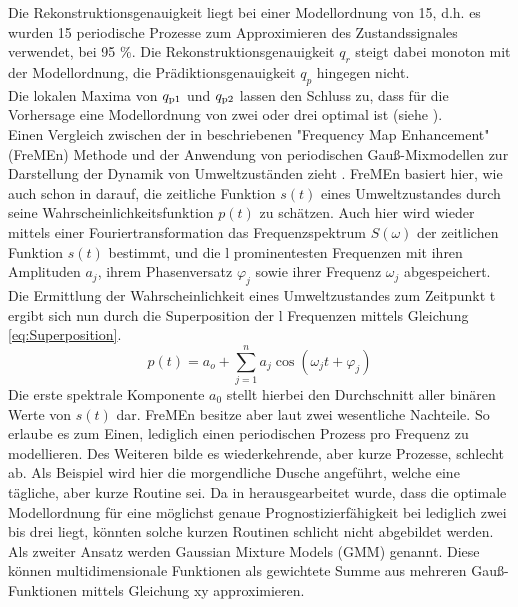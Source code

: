 Die Rekonstruktionsgenauigkeit liegt bei einer Modellordnung von 15, d.h. es wurden 15 periodische Prozesse zum Approximieren des Zustandssignales verwendet, bei 95 \%. Die Rekonstruktionsgenauigkeit $q_r$ steigt dabei monoton mit der Modellordnung, die Prädiktionsgenauigkeit $q_p$ hingegen nicht. %
\\
Die lokalen Maxima von $q_{\mathrm{p1}}$ und $q_{\mathrm{p2}}$ lassen den Schluss zu, dass für die Vorhersage eine Modellordnung von zwei oder drei optimal ist (siehe ). \\
Einen Vergleich zwischen der in \cite{Krajnik.2014} beschriebenen "Frequency Map Enhancement" (FreMEn) Methode und der Anwendung von periodischen Gauß-Mixmodellen zur Darstellung der Dynamik von Umweltzuständen zieht \cite{Krajnik.2015b}. FreMEn basiert hier, wie auch schon in \cite{Krajnik.2014} darauf, die zeitliche Funktion $s(t)$ eines Umweltzustandes durch seine Wahrscheinlichkeitsfunktion $p(t)$ zu schätzen. Auch hier wird wieder mittels einer Fouriertransformation das Frequenzspektrum $S(\omega)$ der zeitlichen Funktion $s(t)$ bestimmt, und die l prominentesten Frequenzen mit ihren Amplituden $a_j$, ihrem Phasenversatz $\varphi_j$ sowie ihrer Frequenz $\omega_j$ abgespeichert. Die Ermittlung der Wahrscheinlichkeit eines Umweltzustandes zum Zeitpunkt t ergibt sich nun durch die Superposition der l Frequenzen mittels Gleichung \ref{eq:Superposition}.
\begin{equation}
	p(t) = a_o + \sum_{j=1}^{n} a_j \cos(\omega_j t + \varphi_j)
	\label{eq:Superposition}
\end{equation}
Die erste spektrale Komponente $a_0$ stellt hierbei den Durchschnitt aller binären Werte von $s(t)$ dar. FreMEn besitze aber laut \cite{Krajnik.2015b} zwei wesentliche Nachteile. So erlaube es zum Einen, lediglich einen periodischen Prozess pro Frequenz zu modellieren. Des Weiteren bilde es wiederkehrende, aber kurze Prozesse, schlecht ab. Als Beispiel wird hier die morgendliche Dusche angeführt, welche eine tägliche, aber kurze Routine sei. Da in \cite{Krajnik.2014} herausgearbeitet wurde, dass die optimale Modellordnung für eine möglichst genaue Prognostizierfähigkeit bei lediglich zwei bis drei liegt, könnten solche kurzen Routinen schlicht nicht abgebildet werden. \\ Als zweiter Ansatz werden Gaussian Mixture Models (GMM) genannt. Diese können multidimensionale Funktionen als gewichtete Summe aus mehreren Gauß-Funktionen mittels Gleichung xy approximieren.
